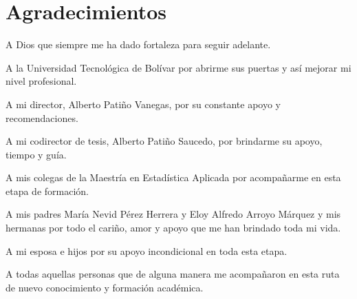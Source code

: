 \chapter*{Agradecimientos}
\setcounter{page}{2}

  \Item A Dios que siempre me ha dado fortaleza para seguir adelante.\newline

  \Item A la Universidad Tecnológica de Bolívar por abrirme sus puertas y así mejorar mi nivel profesional.\newline
  
  \Item A mi director, Alberto Patiño Vanegas, por su constante apoyo y recomendaciones.\newline
  
  \Item A mi codirector de tesis, Alberto Patiño Saucedo, por brindarme su apoyo, tiempo y guía.\newline
  
  \Item A mis colegas de la Maestría en Estadística Aplicada por acompañarme en esta etapa de formación.\newline
  
  \Item A mis padres María Nevid Pérez Herrera y Eloy Alfredo Arroyo Márquez y mis hermanas por todo el cariño, amor y apoyo que me han brindado toda mi vida.\newline
  
  \Item A mi esposa e hijos por su apoyo incondicional en toda esta etapa.\newline
  
  \Item A todas aquellas personas que de alguna manera me acompañaron en esta ruta de nuevo conocimiento y formación académica.\newline
  
